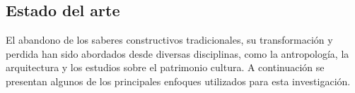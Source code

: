 \subsection{Estado del arte}

El abandono de los saberes constructivos tradicionales, su transformación y perdida han sido abordados desde diversas disciplinas, como la antropología, la arquitectura y los estudios sobre el patrimonio cultura. A continuación se presentan algunos de los principales enfoques utilizados para esta investigación.
